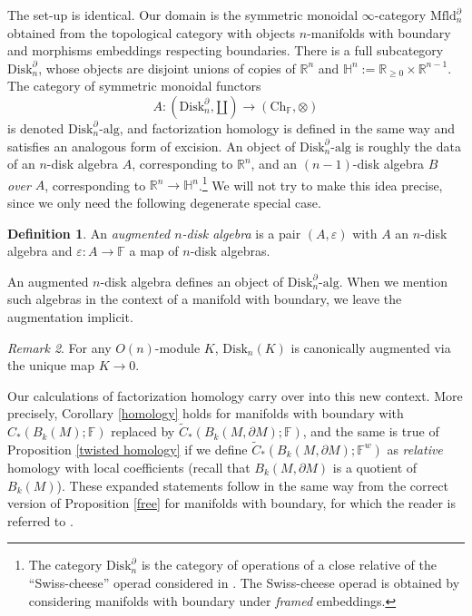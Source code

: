 \documentclass{compositio}
\theoremstyle{definition}\newtheorem{definition}{Definition}[section]
\theoremstyle{theorem}\newtheorem{lemma}[definition]{Lemma}
\theoremstyle{remark}\newtheorem*{conventions}{Conventions}
\theoremstyle{remark}\newtheorem*{acknowledgments}{Acknowledgments}
\theoremstyle{remark}\newtheorem*{outline}{Outline}
\theoremstyle{remark}\newtheorem*{questions}{Questions}
\theoremstyle{remark}\newtheorem{example}[definition]{Example}
\theoremstyle{definition}\newtheorem{construction}[definition]{Construction}
\theoremstyle{definition}\newtheorem*{convention}{Convention}
\theoremstyle{definition}\newtheorem*{conjecture}{Conjecture}
\theoremstyle{theorem}\newtheorem{theorem}[definition]{Theorem}
\theoremstyle{theorem}\newtheorem{paradigm}[definition]{Paradigm}
\theoremstyle{remark}\newtheorem{remark}[definition]{Remark}
\theoremstyle{corollary}\newtheorem{corollary}[definition]{Corollary}
\theoremstyle{theorem}\newtheorem{proposition}[definition]{Proposition}
\theoremstyle{definition}\newtheorem{question}[definition]{Question}
\begin{document}
The set-up is identical. Our domain is the symmetric monoidal $\infty$-category ${\mathrm{Mfld}}_n^\partial$ obtained from the topological category with objects $n$-manifolds with boundary and morphisms embeddings respecting boundaries. There is a full subcategory ${\mathrm{Disk}}_n^\partial$, whose objects are disjoint unions of copies of $\mathbb{R}^n$ and $\mathbb{H}^n:=\mathbb{R}_{\geq0}\times\mathbb{R}^{n-1}.$ The category of symmetric monoidal functors $$A:({\mathrm{Disk}}_n^\partial,\amalg) \to({\mathrm{Ch}}_\mathbb{F},\otimes)$$ is denoted ${\mathrm{Disk}}_n^\partial\text{-}\mathrm{alg}$, and factorization homology is defined in the same way and satisfies an analogous form of excision. An object of ${\mathrm{Disk}}_n^\partial\text{-}\mathrm{alg}$ is roughly the data of an $n$-disk algebra $A$, corresponding to $\mathbb{R}^n$, and an $(n-1)$-disk algebra $B$ \emph{over} $A$, corresponding to $\mathbb{R}^n\to\mathbb{H}^n$.\footnote{The category ${\mathrm{Disk}}_n^\partial$ is the category of operations of a close relative of the ``Swiss-cheese'' operad considered in \cite{Voronov}. The Swiss-cheese operad is obtained by considering manifolds with boundary under \emph{framed} embeddings.} We will not try to make this idea precise, since we only need the following degenerate special case.

\begin{definition}
An \emph{augmented $n$-disk algebra} is a pair $(A,\varepsilon)$ with $A$ an $n$-disk algebra and $\varepsilon:A\to \mathbb{F}$ a map of $n$-disk algebras. 
\end{definition}

An augmented $n$-disk algebra defines an object of ${\mathrm{Disk}}_n^\partial\text{-}\mathrm{alg}$. When we mention such algebras in the context of a manifold with boundary, we leave the augmentation implicit. 

\begin{remark}
For any $O(n)$-module $K$, ${\mathrm{Disk}}_n(K)$ is canonically augmented via the unique map $K\to 0$. 
\end{remark}

Our calculations of factorization homology carry over into this new context. More precisely, Corollary \ref{homology} holds for manifolds with boundary with $C_*(B_k(M);\mathbb{F})$ replaced by $\widetilde{C}_*(B_k(M,\partial M);\mathbb{F})$, and the same is true of Proposition \ref{twisted homology} if we define $\widetilde{C}_*(B_k(M,\partial M);\mathbb{F}^w)$ as \emph{relative} homology with local coefficients (recall that $B_k(M,\partial M)$ is a quotient of $B_k(M)$). These expanded statements follow in the same way from the correct version of Proposition \ref{free} for manifolds with boundary, for which the reader is referred to \cite{AF}.
\end{document}
